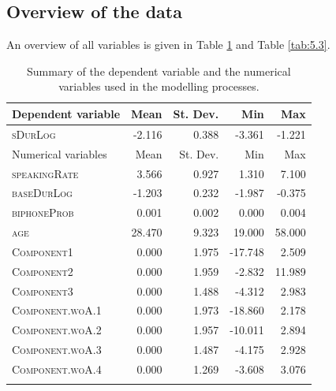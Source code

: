 \subsection{Overview of the data}\label{section05_2_2}

An overview of all variables is given in Table \ref{tab:5.2} and Table \ref{tab:5.3}.

\begin{table}\fontsize{10}{11}
\caption{Summary of the dependent variable and the numerical variables used in the modelling processes.}
\label{tab:5.2}
\centering
\begin{tabular}{lrrrr} 
\lsptoprule
Dependent variable  & Mean   & St. Dev. & Min     & Max     \\ 
\midrule
\textsc{sDurLog}             & -2.116 & 0.388    & -3.361  & -1.221  \\ 
\midrule
Numerical variables & Mean   & St. Dev. & Min     & Max     \\ 
\midrule
\textsc{speakingRate}        & 3.566  & 0.927    & 1.310   & 7.100   \\
\textsc{baseDurLog}          & -1.203 & 0.232    & -1.987  & -0.375  \\
\textsc{biphoneProb}         & 0.001  & 0.002    & 0.000   & 0.004   \\
\textsc{age}                 & 28.470 & 9.323    & 19.000  & 58.000  \\
\textsc{Component1}          & 0.000  & 1.975    & -17.748 & 2.509   \\
\textsc{Component2}          & 0.000  & 1.959    & -2.832  & 11.989  \\
\textsc{Component3}          & 0.000  & 1.488    & -4.312  & 2.983   \\
\textsc{Component.woA.1}     & 0.000  & 1.973    & -18.860 & 2.178   \\
\textsc{Component.woA.2}     & 0.000  & 1.957    & -10.011 & 2.894   \\
\textsc{Component.woA.3}     & 0.000  & 1.487    & -4.175  & 2.928   \\
\textsc{Component.woA.4}     & 0.000  & 1.269    & -3.608  & 3.076   \\
\lspbottomrule
\end{tabular}
\end{table}


